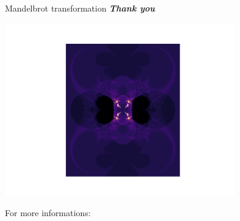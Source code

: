 \documentclass[11pt, compress, tikz]{beamer}
\theoremstyle{definition}
\begin{document}
\begin{frame}{Mandelbrot transformation}
\centering
\textit{\textbf{Thank you}}
\begin{center}
\includegraphics[scale=0.4, width=10cm, clip, trim={0 0 0 1cm}]{transformation.pdf}
\end{center}
\vspace{-1cm}
For more informations: \href{https://github.com/tanglef/chaoseverywhere}{}\href{https://chaoseverywhere.readthedocs.io/en/latest}{}
\end{frame}
\end{document}
